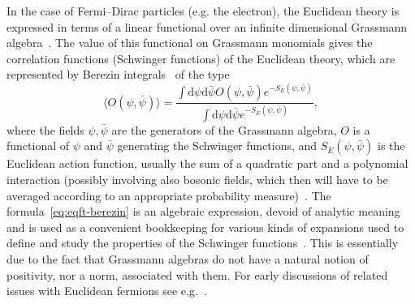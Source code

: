 \documentclass[11pt]{article}
\newcommand{\mathd}{\mathrm{d}}
\begin{document}
In the case of Fermi--Dirac particles (e.g. the electron), the Euclidean
theory is expressed in terms of a linear functional over an infinite
dimensional Grassmann
algebra~{\cite{schwinger_euclidean_1958,schwinger_euclidean_1959,nakano_quantum_1959,osterwalder_euclidean_1973,osterwalder_euclidean_1973-2}}.
The value of this functional on Grassmann monomials gives the correlation
functions (Schwinger functions) of the Euclidean theory, which are represented
by Berezin integrals~{\cite{Berezin1,Berezin2}} of the type
\begin{equation}
  \langle O (\psi, \bar{\psi}) \rangle = \frac{\int \mathd \psi \mathd
  \bar{\psi} O (\psi, \bar{\psi}) e^{- S_E (\psi, \bar{\psi})}}{\int \mathd
  \psi \mathd \bar{\psi} e^{- S_E (\psi, \bar{\psi})}},
  \label{eq:eqft-berezin}
\end{equation}
where the fields $\psi, \bar{\psi}$ are the generators of the Grassmann
algebra, $O$ is a functional of $\psi$ and $\bar{\psi}$ generating the
Schwinger functions, and $S_E (\psi, \bar{\psi})$ is the Euclidean action
function, usually the sum of a quadratic part and a polynomial interaction
(possibly involving also bosonic fields, which then will have to be averaged
according to an appropriate probability
measure)~{\cite{feldman_renormalizable_1986,disertori_continuous_1998,mastropietro_non-perturbative_2008}}.
The formula~{\eqref{eq:eqft-berezin}} is an algebraic expression, devoid of
analytic meaning and is used as a convenient bookkeeping for various kinds of
expansions used to define and study the properties of the Schwinger
functions~{\cite{rivasseau_perturbative_1991,salmhofer_renormalization,mastropietro_non-perturbative_2008}}.
This is essentially due to the fact that Grassmann algebras do not have a
natural notion of positivity, nor a norm, associated with them. For early
discussions of related issues with Euclidean fermions see
e.g.~{\cite{frohlich_is_1975,janson_gaussian_1997}}.

\
\end{document}
